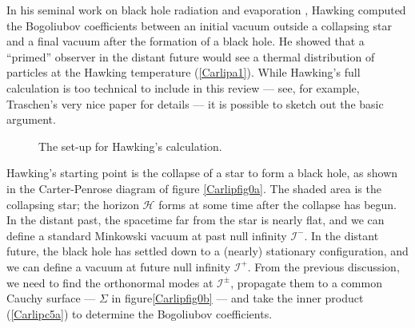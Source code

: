 \documentclass[11pt]{article}
\begin{document}
In his seminal work on black hole radiation and evaporation 
\cite{Hawking,Hawkingc}, Hawking computed the Bogoliubov 
coefficients between an initial vacuum outside a collapsing star 
and a final vacuum after the formation of a black hole.  He showed 
that a ``primed'' observer in the distant future would see a thermal 
distribution of particles at the Hawking temperature (\ref{Carlipa1}).  
While Hawking's full calculation is too technical to include
in this review --- see, for example, Traschen's very nice paper
\cite{Traschen} for details --- it is possible to sketch out the basic
argument.
\begin{figure}[ht]
\centerline{
\hspace*{30pt}
}
\caption{The set-up for Hawking's calculation.} \label{Carlipfig0}
\end{figure}

Hawking's starting point is the collapse of a star to form a black hole,
as shown in the Carter-Penrose diagram of figure \ref{Carlipfig0a}. The
shaded area is the collapsing star; the horizon $\mathcal{H}$ forms at
some time after the collapse has begun.  
In the distant past, the spacetime far from the star is nearly flat, and we
can define a standard Minkowski vacuum at past null infinity $\mathcal{I}^-$.
In the distant future, the black hole has settled down to a (nearly) stationary
configuration, and we can define a vacuum at future null infinity $\mathcal{I}^+$.
From the previous discussion, we need to find the orthonormal modes 
at $\mathcal{I}^\pm$, propagate them to a common Cauchy surface --- 
$\Sigma$ in figure\ref{Carlipfig0b} --- and take the inner product (\ref{Carlipc5a}) 
to determine the Bogoliubov coefficients.
\end{document}
